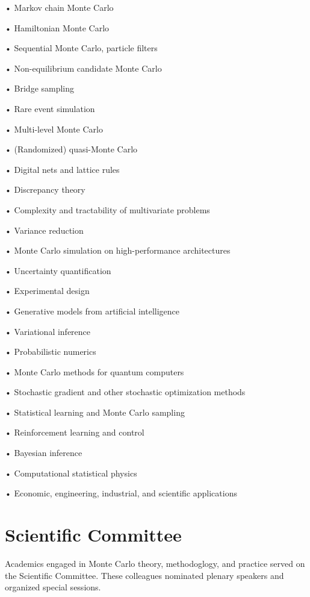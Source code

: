 \setlength{\columnsep}{1cm}
\begin{multicols}{2}
	\raggedright
	• Markov chain Monte Carlo
	
	• Hamiltonian Monte Carlo
	
	• Sequential Monte Carlo, particle filters
	
	• Non-equilibrium candidate Monte Carlo
	
	• Bridge sampling
	
	• Rare event simulation
	
	• Multi-level Monte Carlo
	
	• (Randomized) quasi-Monte Carlo
	
	• Digital nets and lattice rules
	
	• Discrepancy theory
	
	• Complexity and tractability of multivariate problems
	
	• Variance reduction
	
	• Monte Carlo simulation on high-performance architectures
	
	• Uncertainty quantification
	
	• Experimental design
	
	• Generative models from artificial intelligence
	
	• Variational inference
	
	• Probabilistic numerics
	
	• Monte Carlo methods for quantum computers
	
	• Stochastic gradient and other stochastic optimization methods
	
	• Statistical learning and Monte Carlo sampling
	
	• Reinforcement learning and control
	
	• Bayesian inference
	
	• Computational statistical physics
	
	• Economic, engineering, industrial, and scientific applications
	
\end{multicols}






\section{Scientific Committee}

Academics engaged in Monte Carlo theory, methodoglogy, and practice served on the Scientific Committee.  These colleagues nominated plenary speakers and organized special sessions.



